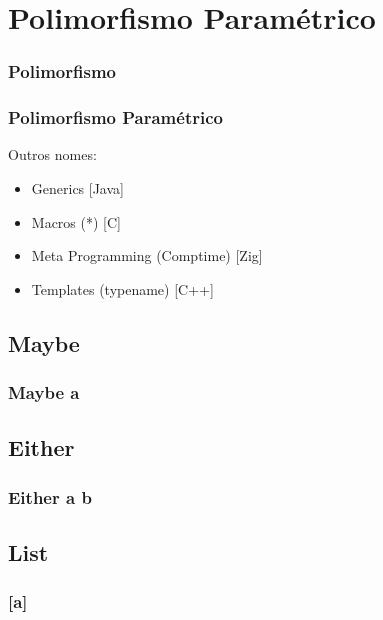 \documentclass{beamer}
\begin{document}
\section{Polimorfismo Paramétrico}
\begin{frame}
    \frametitle{Polimorfismo}
\end{frame}

\begin{frame}
    \frametitle{Polimorfismo Paramétrico}
    Outros nomes:
    \begin{itemize}
        \item Generics [Java]
        \item Macros (*) [C]
        \item Meta Programming (Comptime) [Zig]
        \item Templates (typename) [C++]
    \end{itemize}
\end{frame}

\subsection{Maybe}
\begin{frame}
    \frametitle{Maybe a}
\end{frame}

\subsection{Either}
\begin{frame}
    \frametitle{Either a b}
\end{frame}

\subsection{List}
\begin{frame}
    \frametitle{[a]}
\end{frame}
\end{document}
